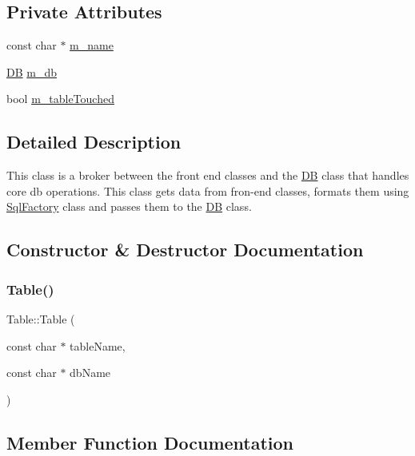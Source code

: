 \subsection*{Private Attributes}
\begin{DoxyCompactItemize}
\item 
const char $\ast$ \mbox{\hyperlink{classTable_aaa150472b3686c7d86a5af58e7970f4a}{m\+\_\+name}}
\item 
\mbox{\hyperlink{classDB}{DB}} \mbox{\hyperlink{classTable_ab6a536f7b7619cd252c6f7b67909a505}{m\+\_\+db}}
\item 
bool \mbox{\hyperlink{classTable_a76e6e836dd4e86fa85064ed8a5f0d425}{m\+\_\+table\+Touched}}
\end{DoxyCompactItemize}


\subsection{Detailed Description}
This class is a broker between the front end classes and the \mbox{\hyperlink{classDB}{DB}} class that handles core db operations. This class gets data from fron-\/end classes, formats them using \mbox{\hyperlink{classSqlFactory}{Sql\+Factory}} class and passes them to the \mbox{\hyperlink{classDB}{DB}} class. 

\subsection{Constructor \& Destructor Documentation}
\mbox{\label{classTable_ae35623804222a53627bdcaa9e180640f}} 
\subsubsection{\texorpdfstring{Table()}{Table()}}
{\footnotesize\ttfamily Table\+::\+Table (\begin{DoxyParamCaption}\item[{const char $\ast$}]{table\+Name,  }\item[{const char $\ast$}]{db\+Name }\end{DoxyParamCaption})}



\subsection{Member Function Documentation}
\mbox{\label{classTable_a861e8d9af1231690429629471fdd652b}} 
